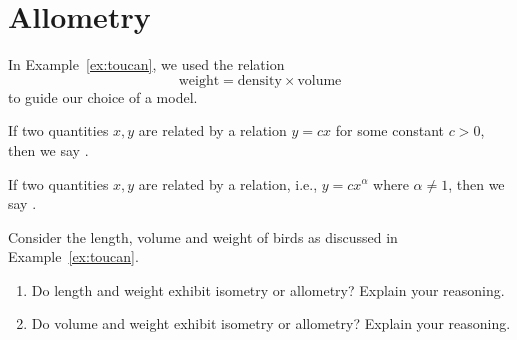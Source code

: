 \documentclass[../main.tex]{subfiles}
\begin{document}
 \section{Allometry}
In Example~\ref{ex:toucan}, we used the relation \[\text{weight} = \text{density} \times \text{volume} \] to guide our choice of a model. 

\begin{mdframed}[style=simple]
  If two quantities \(x,y\) are related by a  relation \(y = c x\) for some constant \(c > 0\), then we say .

  If two quantities \(x,y\) are related by a  relation, i.e., \(y = c x^{\alpha}\) where \(\alpha \ne 1\), then we say .
\end{mdframed}

\begin{example}
  Consider the length, volume and weight of birds as discussed in Example~\ref{ex:toucan}.

  \begin{enumerate}[wide]
    \item Do length and weight exhibit isometry or allometry? Explain your reasoning.

    \item Do volume and weight exhibit isometry or allometry? Explain your reasoning.
  \end{enumerate}
\end{example}
\end{document}
